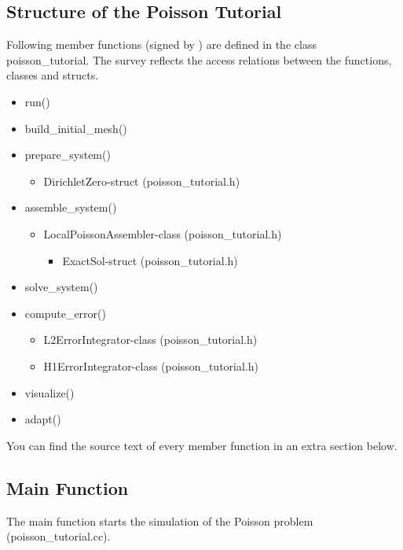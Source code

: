 \documentclass[a4paper, 11pt, twoside]{article}
\begin{document}
\subsection{Structure of the Poisson Tutorial}
Following member functions (signed by \textbullet) are defined in the class poisson\_tutorial. The survey reflects the  access relations between the functions, classes and structs. 
 \begin{itemize}
    \item run()
    \item build\_initial\_mesh()
    \item prepare\_system()
    \begin{itemize}
	\item DirichletZero-struct (poisson\_tutorial.h)
    \end{itemize}
    \item assemble\_system()
    \begin{itemize}
	\item LocalPoissonAssembler-class (poisson\_tutorial.h)
        \begin{itemize}
	    \item ExactSol-struct (poisson\_tutorial.h)
	\end{itemize}    
    \end{itemize}    
    \item solve\_system()
    \item compute\_error()
    \begin{itemize}
	\item L2ErrorIntegrator-class (poisson\_tutorial.h)
	\item H1ErrorIntegrator-class (poisson\_tutorial.h)    
    \end{itemize}  
    \item visualize()
    \item adapt()
 \end{itemize} 
You can find the source text of every member function  in an extra section below. 


\subsection{Main Function}\label{sectionmain}
The main function starts the simulation of the Poisson problem (poisson\_tutorial.cc).
\end{document}
